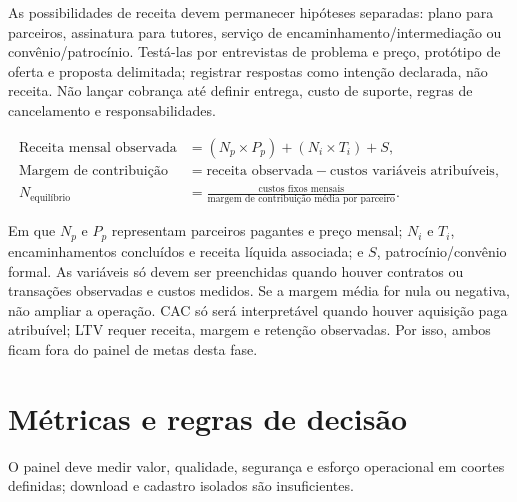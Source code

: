 \documentclass[12pt,a4paper]{article}
\begin{document}
As possibilidades de receita devem permanecer hipóteses separadas: plano para parceiros, assinatura para tutores, serviço de encaminhamento/intermediação ou convênio/patrocínio. Testá-las por entrevistas de problema e preço, protótipo de oferta e proposta delimitada; registrar respostas como intenção declarada, não receita. Não lançar cobrança até definir entrega, custo de suporte, regras de cancelamento e responsabilidades.

\begin{align*}
\text{Receita mensal observada} &= (N_p \times P_p) + (N_i \times T_i) + S,\\
\text{Margem de contribuição} &= \text{receita observada} - \text{custos variáveis atribuíveis},\\
N_{\text{equilíbrio}} &= \frac{\text{custos fixos mensais}}{\text{margem de contribuição média por parceiro}}.
\end{align*}

Em que $N_p$ e $P_p$ representam parceiros pagantes e preço mensal; $N_i$ e $T_i$, encaminhamentos concluídos e receita líquida associada; e $S$, patrocínio/convênio formal. As variáveis só devem ser preenchidas quando houver contratos ou transações observadas e custos medidos. Se a margem média for nula ou negativa, não ampliar a operação. CAC só será interpretável quando houver aquisição paga atribuível; LTV requer receita, margem e retenção observadas. Por isso, ambos ficam fora do painel de metas desta fase.

\section{Métricas e regras de decisão}
O painel deve medir valor, qualidade, segurança e esforço operacional em coortes definidas; download e cadastro isolados são insuficientes.
\end{document}
